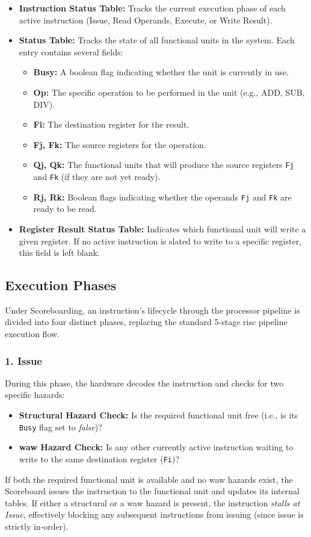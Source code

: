 \begin{itemize}
    \item \textbf{Instruction Status Table:} Tracks the current execution phase of each active instruction (Issue, Read Operands, Execute, or Write Result).
    \item \textbf{ Status Table:} Tracks the state of all functional units in the system. Each entry contains several fields:
    \begin{itemize}
        \item \textbf{Busy:} A boolean flag indicating whether the unit is currently in use.
        \item \textbf{Op:} The specific operation to be performed in the unit (e.g., ADD, SUB, DIV).
        \item \textbf{Fi:} The destination register for the result.
        \item \textbf{Fj, Fk:} The source registers for the operation.
        \item \textbf{Qj, Qk:} The functional units that will produce the source registers \texttt{Fj} and \texttt{Fk} (if they are not yet ready).
        \item \textbf{Rj, Rk:} Boolean flags indicating whether the operands \texttt{Fj} and \texttt{Fk} are ready to be read.
    \end{itemize}
    \item \textbf{Register Result Status Table:} Indicates which functional unit will write a given register. If no active instruction is slated to write to a specific register, this field is left blank.
\end{itemize}

\subsection{Execution Phases}

Under Scoreboarding, an instruction's lifecycle through the processor pipeline is divided into four distinct phases, replacing the standard 5-stage \gls{risc} pipeline execution flow.

\subsubsection{1. Issue}
During this phase, the hardware decodes the instruction and checks for two specific hazards:
\begin{itemize}
    \item \textbf{Structural Hazard Check:} Is the required functional unit free (i.e., is its \texttt{Busy} flag set to \textit{false})?
    \item \textbf{\gls{waw} Hazard Check:} Is any other currently active instruction waiting to write to the same destination register (\texttt{Fi})? 
\end{itemize}
If both the required functional unit is available and no \gls{waw} hazards exist, the Scoreboard issues the instruction to the functional unit and updates its internal tables. If either a structural or a \gls{waw} hazard is present, the instruction \textit{stalls at Issue}, effectively blocking any subsequent instructions from issuing (since issue is strictly in-order).

